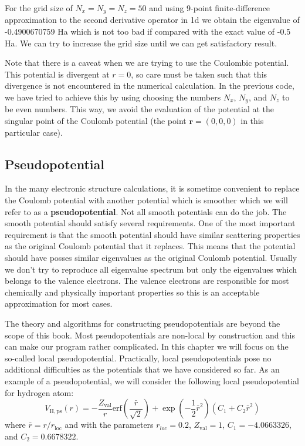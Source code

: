 For the grid size of $N_{x}=N_{y}=N_{z}=50$ and using 9-point finite-difference approximation
to the second derivative operator in 1d we obtain the eigenvalue of -0.4900670759 Ha which
is not too bad if compared with the exact value of -0.5 Ha. We can try to increase the grid
size until we can get satisfactory result.

Note that there is a caveat when we are trying to use the Coulombic potential. This potential
is divergent at $r=0$, so care must be taken such that this divergence is not encountered in
the numerical calculation. In the previous code, we have tried to achieve this by using
choosing the numbers
$N_{x}$, $N_{y}$, and $N_{z}$ to be even numbers. This way, we avoid the evaluation of
the potential at the singular point of the Coulomb potential
(the point $\mathbf{r} = (0,0,0)$ in this
particular case).

\subsection{Pseudopotential}

In the many electronic structure calculations, it is sometime convenient to replace the
Coulomb potential with another potential which is smoother which we
will refer to as a \textbf{pseudopotential}. Not all smooth
potentials can do the job. The smooth potential should satisfy several requirements.
One of the most important requirement is that the smooth potential should have similar
scattering properties as the original Coulomb potential that it replaces.
This means that the potential should have posses similar eigenvalues as the
original Coulomb potential. Usually we don't try to reproduce all eigenvalue spectrum but only
the eigenvalues which belongs to the valence electrons. The valence electrons are
responsible for most chemically and physically important properties so this is an
acceptable approximation for most cases.

The theory and algorithms for constructing pseudopotentials are beyond the scope of
this book.
Most pseudopotentials are non-local by construction and this can make our program rather
complicated.
In this chapter we will focus on the so-called local pseudopotential. Practically, local
pseudopotentials pose no additional difficulties as the potentials that we have
considered so far. As an example of a pseudopotential, we will consider the following
local pseudopotential for hydrogen atom:
\begin{equation}
V_{\mathrm{H,ps}}(r) = -\frac{Z_{\mathrm{val}}}{r}
\mathrm{erf}\left( \frac{\bar{r}}{\sqrt{2}} \right) +
\exp\left( -\frac{1}{2}\bar{r}^2 \right)
\left( C_{1} + C_{2}\bar{r}^2 \right)
\label{eq:H_psp_GTH}
\end{equation}
where $\bar{r}=r/r_{\mathrm{loc}}$ and with the parameters $r_{loc}=0.2$, 
$Z_{\mathrm{val}}=1$, $C_{1}=-4.0663326$, and $C_{2}=0.6678322$.

